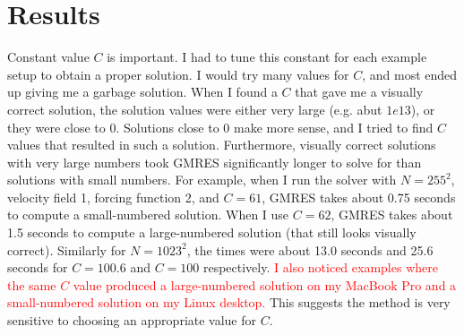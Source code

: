 \documentclass[11pt]{article}
\begin{document}
\section{Results}
Constant value $C$ is important. I had to tune this constant for each example setup to obtain a 
proper solution. I would try many values for $C$, and most ended up giving me a garbage solution. 
When I found a $C$ that gave me a visually correct solution, the solution values were either very
large (e.g. abut $1e13$), or they were close to 0. Solutions close to 0 make more sense, and I
tried to find $C$ values that resulted in such a solution. Furthermore, visually
correct solutions with very large numbers took GMRES significantly longer to solve for than
solutions with small numbers. For example, when I run the solver with $N=255^2$, velocity 
field 1, forcing function 2, and $C=61$, GMRES takes about 0.75 seconds to compute a 
small-numbered solution. When I use $C=62$, GMRES takes about 1.5 seconds to compute a 
large-numbered solution (that still looks visually correct). Similarly for $N=1023^2$, the 
times were about 13.0 seconds and 25.6 seconds for $C=100.6$ and $C=100$ respectively. 
\textcolor{red}{I also noticed examples where the same $C$ value produced a large-numbered solution on my 
MacBook Pro and a small-numbered solution on my Linux desktop.} This suggests the method is very 
sensitive to choosing an appropriate value for $C$.






\end{document}
